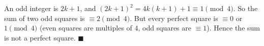An odd integer is $2k+1$, and $(2k+1)^2=4k(k+1)+1\equiv1\pmod4$. So the sum of two odd squares is $\equiv2\pmod4$. But every perfect square is $\equiv0$ or $1\pmod4$ (even squares are multiples of $4$, odd squares are $\equiv1$). Hence the sum is not a perfect square. $\blacksquare$
